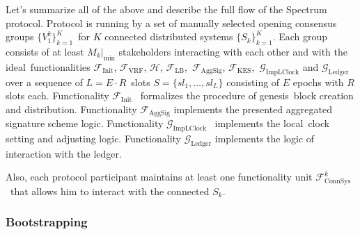 Let's summarize all of the above and describe the full flow of the Spectrum protocol.
Protocol is running by a set of manually selected opening consensus groups $\{V^k_1\}_{k=1}^K$\
for $K$ connected distributed systems $\{S_k\}_{k=1}^K$.
Each group consists of at least $M_k|_{\min}$ stakeholders interacting with each other and with the ideal\
functionalities $\mathcal{F}_{\text{Init}}$, ${\mathcal{F}}_{\text{VRF}}$, $\mathcal{H}$, ${\mathcal{F}}_{\text{LB}}$,\
$\mathcal{F}_{\text{AggSig}}$, ${\mathcal{F}}_{\text{KES}}$,\
$\mathcal{G}_{\text{ImpLClock}}$ and $\mathcal{G}_{\text{Ledger}}$ over a sequence of $L = E \cdot R$\
slots ${S=\{sl_1,\dots,sl_L\}}$ consisting of $E$ epochs with $R$ slots each.
Functionality ${\mathcal{F}}_{\text{Init}}$~\cite{Badertscher2018} formalizes the procedure of genesis\
block creation and distribution.
Functionality ${\mathcal{F}}_{\text{AggSig}}$ implements the presented aggregated signature scheme logic.
Functionality $\mathcal{G}_{\text{ImpLClock}}$~\cite{cryptoeprint:2019/838} implements the local\
clock setting and adjusting logic.
Functionality $\mathcal{G}_{\text{Ledger}}$ implements the logic of interaction with the ledger.

Also, each protocol participant maintains at least one functionality unit $\mathcal{F}^k_{\text{ConnSys}}$\
that allows him to interact with the connected $S_k$.

\subsubsection{Bootstrapping}\label{subsubsec:bootstrapping}

